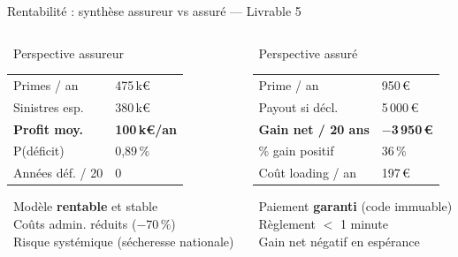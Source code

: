 \documentclass[aspectratio=169, 10pt, t]{beamer}
\newcommand{\euro}{€}
\begin{document}
\begin{frame}{Rentabilité : synthèse assureur vs assuré --- Livrable 5}
  \begin{columns}[t]
      \begin{block}{\faBuilding\ Perspective assureur}
        \renewcommand{\arraystretch}{1.2}
        \small
        \begin{tabular}{@{}ll@{}}
          Primes / an       & 475\,k\euro \\
          Sinistres esp.    & 380\,k\euro \\
          \textbf{Profit moy.} & \textbf{100\,k\euro/an} \\
          P(déficit)        & 0{,}89\,\% \\
          Années déf. / 20  & 0 \\
        \end{tabular}

        \vspace{0.3em}
        \textcolor{SuccessGreen}{\faCheckCircle}\ Modèle \textbf{rentable} et stable\\
        \textcolor{SuccessGreen}{\faCheckCircle}\ Coûts admin. réduits ($-70\,\%$)\\
        \textcolor{WarnOrange}{\faExclamationTriangle}\ Risque systémique (sécheresse nationale)
      \end{block}
      \begin{block}{\faUser\ Perspective assuré}
        \renewcommand{\arraystretch}{1.2}
        \small
        \begin{tabular}{@{}ll@{}}
          Prime / an        & 950\,\euro \\
          Payout si décl.   & 5\,000\,\euro \\
          \textbf{Gain net / 20 ans} & \textbf{$-$3\,950\,\euro} \\
          \% gain positif   & 36\,\% \\
          Coût loading / an & 197\,\euro \\
        \end{tabular}

        \vspace{0.3em}
        \textcolor{SuccessGreen}{\faCheckCircle}\ Paiement \textbf{garanti} (code immuable)\\
        \textcolor{SuccessGreen}{\faCheckCircle}\ Règlement $<$ 1 minute\\
        \textcolor{WarnOrange}{\faExclamationTriangle}\ Gain net négatif en espérance
      \end{block}
  \end{columns}
\end{frame}
\end{document}
